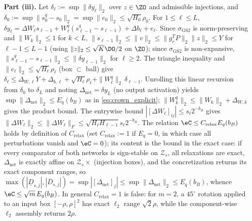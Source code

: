 \textbf{Part (iii).} Let \(\delta_\ell := \sup\|\delta y_\ell\|_2\) over \(z \in \ZO\) and admissible injections, and \(\delta_0 := \sup\|s_0^q - s_0\|_2 = \sup\|e_0\|_2 \le \sqrt{H_0}\rho_0\). For \(1 \le \ell \le L\),
\(\delta y_\ell = \Delta W_\ell s_{\ell-1} + W_\ell^q(s_{\ell-1}^q - s_{\ell-1}) + \Delta b_\ell + e_\ell\). Since \(\sigma_{\mathrm{GS2}}\) is norm-preserving and \(\|W_k\|_2 \le 1\) for \(k < L\), \(\|s_{\ell-1}\|_2 \le \|v\|_2 \le \|g_r^TP\|_2\|z\|_2 \le Y\) for \(\ell - 1 \le L - 1\) (using \(\|z\|_2 \le \sqrt{K}\DO/2\) on \(\ZO\)); since \(\sigma_{\mathrm{GS2}}\) is non-expansive, \(\|s_{\ell-1}^q - s_{\ell-1}\|_2 \le \|\delta y_{\ell-1}\|_2\) for \(\ell \ge 2\). The triangle inequality and \(\|e_\ell\|_2 \le \sqrt{H_\ell}\rho_\ell\) (box \(\subset\) ball) give \(\delta_\ell \le \Delta_{W,\ell}Y + \Delta_{b,\ell} + \sqrt{H_\ell}\rho_\ell + \|W_\ell^q\|_2\,\delta_{\ell-1}\). Unrolling this linear recursion from \(\delta_0\) to \(\delta_L\) and noting \(\Delta_{\mathrm{net}} = \delta y_L\) (no output activation) yields \(\sup\|\Delta_{\mathrm{net}}\|_2 \le E_q(b_B)\) as in \eqref{eq:crown_explicit}; \(\|W_k^q\|_2 \le \|W_k\|_2 + \Delta_{W,k}\) gives the product bound. The entrywise bound \(|[\Delta W_\ell]_{ij}| \le s_\ell2^{-b_B}\) gives \(\|\Delta W_\ell\|_2 \le \|\Delta W_\ell\|_F \le \sqrt{H_\ell H_{\ell-1}}s_\ell2^{-b_B}\). The relation \(\eC \le C_{\mathrm{relax}}E_q(b_B)\) holds by definition of \(C_{\mathrm{relax}}\) (set \(C_{\mathrm{relax}} := 1\) if \(E_q = 0\), in which case all perturbations vanish and \(\eC = 0\)); its content is the bound in the exact case: if every comparator of both networks is sign-stable on \(\mathcal{Z}_s\), all relaxations are exact, \(\Delta_{\mathrm{net}}\) is exactly affine on \(\mathcal{Z}_s \times\) (injection boxes), and the concretization returns its exact component ranges, so \(\max(|\underline{D}_{s,j}|, |\overline{D}_{s,j}|) = \sup|[\Delta_{\mathrm{net}}]_j| \le \sup\|\Delta_{\mathrm{net}}\|_2 \le E_q(b_B)\), whence \(\eC \le \sqrt{m}\,E_q(b_B)\). In general \(C_{\mathrm{relax}} = 1\) is false: for \(m = 2\), a \(45^\circ\) rotation applied to an input box \([-\rho,\rho]^2\) has exact \(\ell_2\) range \(\sqrt2\rho\), while the component-wise \(\ell_2\) assembly returns \(2\rho\).


